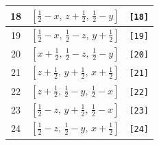 \documentclass[fleqn,8pt]{jsarticle}
\begin{document}
\begin{longtable}{ccc}
18 & $\left[ \frac{1}{2} - x,\, z + \frac{1}{2},\, \frac{1}{2} - y \right]$ & {\tt [18]} \\ \hline
19 & $\left[ \frac{1}{2} - x,\, \frac{1}{2} - z,\, y + \frac{1}{2} \right]$ & {\tt [19]} \\ \hline
20 & $\left[ x + \frac{1}{2},\, \frac{1}{2} - z,\, \frac{1}{2} - y \right]$ & {\tt [20]} \\ \hline
21 & $\left[ z + \frac{1}{2},\, y + \frac{1}{2},\, x + \frac{1}{2} \right]$ & {\tt [21]} \\ \hline
22 & $\left[ z + \frac{1}{2},\, \frac{1}{2} - y,\, \frac{1}{2} - x \right]$ & {\tt [22]} \\ \hline
23 & $\left[ \frac{1}{2} - z,\, y + \frac{1}{2},\, \frac{1}{2} - x \right]$ & {\tt [23]} \\ \hline
24 & $\left[ \frac{1}{2} - z,\, \frac{1}{2} - y,\, x + \frac{1}{2} \right]$ & {\tt [24]} \\
\end{longtable}
\end{document}
